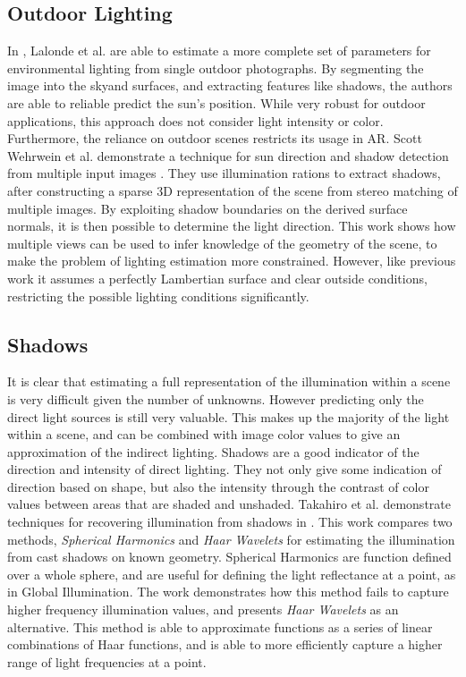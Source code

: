 \documentclass[ %
                    author={Gavin Parker},
                supervisor={Dr. Neill Campbell},
                    degree={MEng},
                     title={Deep Siamese Networks for Illumination Estimation from Stereo Images},
                  subtitle={},
                      type={Research},
                      year={2018} ]{dissertation}
\begin{document}
\subsection{Outdoor Lighting}
In \cite{Lalonde-2009-10350}, Lalonde et al. are able to estimate a more complete set of parameters for environmental lighting from single outdoor photographs. By segmenting the image into the skyand surfaces, and extracting features like shadows, the authors are able to reliable predict the sun's position. While very robust for outdoor applications, this approach does not consider light intensity or color. Furthermore, the reliance on outdoor scenes restricts its usage in AR.
Scott Wehrwein et al. demonstrate a technique for sun direction and shadow detection from multiple input images \cite{7335515}. They use illumination rations to extract shadows, after constructing a sparse 3D representation of the scene from stereo matching of multiple images. By exploiting shadow boundaries on the derived surface normals, it is then possible to determine the light direction. This work shows how multiple views can be used to infer knowledge of the geometry of the scene, to make the problem of lighting estimation more constrained. However, like previous work it assumes a perfectly Lambertian surface and clear outside conditions, restricting the possible lighting conditions significantly.
\subsection{Shadows}
It is clear that estimating a full representation of the illumination within a scene is very difficult given the number of unknowns. However predicting only the direct light sources is still very valuable. This makes up the majority of the light within a scene, and can be combined with image color values to give an approximation of the indirect lighting. Shadows are a good indicator of the direction and intensity of direct lighting. They not only give some indication of direction based on shape, but also the intensity through the contrast of color values between areas that are shaded and unshaded. Takahiro et al. demonstrate techniques for recovering illumination from shadows in \cite{1315013}. This work compares two methods, \textit{Spherical Harmonics} and \textit{Haar Wavelets} for estimating the illumination from cast shadows on known geometry. Spherical Harmonics are function defined over a whole sphere, and are useful for defining the light reflectance at a point, as in Global Illumination. The work demonstrates how this method fails to capture higher frequency illumination values, and presents \textit{Haar Wavelets} as an alternative. This method is able to approximate functions as a series of linear combinations of Haar functions, and is able to more efficiently capture a higher range of light frequencies at a point.
\end{document}
